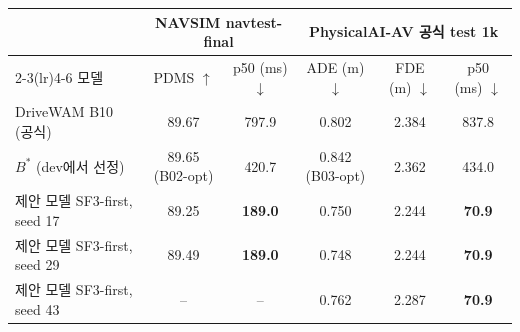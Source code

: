 \documentclass[nouppercase]{kaia}
\begin{document}
\begin{mdframed}
\begin{center}
\small
\setlength{\tabcolsep}{5pt}
\begin{tabular}{lcc@{\hskip 14pt}ccc}
\toprule
 & \multicolumn{2}{c}{NAVSIM navtest-final} & \multicolumn{3}{c}{PhysicalAI-AV 공식 test 1k} \\
\cmidrule(lr){2-3}\cmidrule(lr){4-6}
모델 & PDMS $\uparrow$ & p50 (ms) $\downarrow$ & ADE (m) $\downarrow$ & FDE (m) $\downarrow$ & p50 (ms) $\downarrow$ \\
\midrule
DriveWAM B10 (공식)      & 89.67 & 797.9 & 0.802 & 2.384 & 837.8 \\
$B^{*}$ (dev에서 선정) & 89.65 (B02-opt) & 420.7 & 0.842 (B03-opt) & 2.362 & 434.0 \\
제안 모델 SF3-first, seed 17 & 89.25 & \textbf{189.0} & 0.750 & 2.244 & \textbf{70.9} \\
제안 모델 SF3-first, seed 29 & 89.49 & \textbf{189.0} & 0.748 & 2.244 & \textbf{70.9} \\
제안 모델 SF3-first, seed 43 & --    & --    & 0.762 & 2.287 & \textbf{70.9} \\
\bottomrule
\end{tabular}
\label{tab:final}
\end{center}


\end{mdframed}
\end{document}

